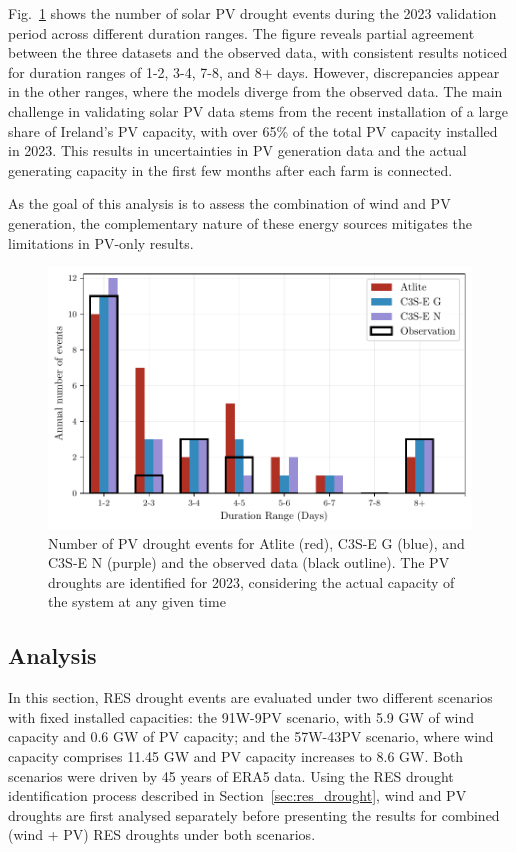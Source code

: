 \documentclass[preprint, 12pt]{elsarticle}
\begin{document}
Fig.~\ref{fig:bar_number_events_verification_pv} shows the number of solar PV drought events during the 2023 validation period across different duration ranges. The figure reveals partial agreement between the three datasets and the observed data, with consistent results noticed for duration ranges of 1-2, 3-4, 7-8, and 8+ days. However, discrepancies appear in the other ranges, where the models diverge from the observed data. The main challenge in validating solar PV data stems from the recent installation of a large share of Ireland’s PV capacity, with over 65\% of the total PV capacity installed in 2023. This results in uncertainties in PV generation data and the actual generating capacity in the first few months after each farm is connected.

As the goal of this analysis is to assess the combination of wind and PV generation, the complementary nature of these energy sources mitigates the limitations in PV-only results.

\begin{figure}[!ht]
	\centering
	\includegraphics[width=\textwidth]{verification_pv_number_events.pdf}
	\caption{Number of PV drought events for Atlite (red), C3S-E G (blue), and C3S-E N (purple) and the observed data (black outline). The PV droughts are identified for 2023, considering the actual capacity of the system at any given time}
	\label{fig:bar_number_events_verification_pv}
\end{figure}

\subsection{Analysis}
\label{sec:analysis}

In this section, RES drought events are evaluated under two different scenarios with fixed installed capacities: the 91W-9PV scenario, with 5.9 GW of wind capacity and 0.6 GW of PV capacity; and the 57W-43PV scenario, where wind capacity comprises 11.45 GW and PV capacity increases to 8.6 GW. Both scenarios were driven by 45 years of ERA5 data. Using the RES drought identification process described in Section~\ref{sec:res_drought}, wind and PV droughts are first analysed separately before presenting the results for combined (wind + PV) RES droughts under both scenarios.
\end{document}
